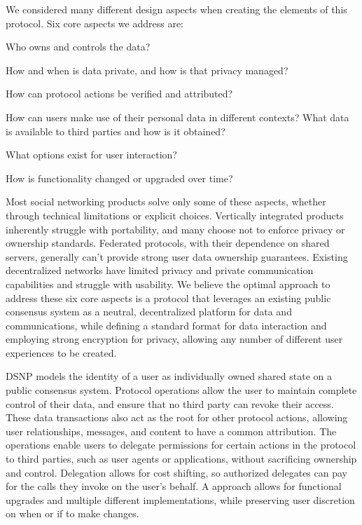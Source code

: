 \documentclass[12pt,letterpaper]{article}
\providecommand{\tightlist}{%
\setlength{\itemsep}{0pt}\setlength{\parskip}{0pt}}
\begin{document}
\begin{samepage}
	We considered many different design aspects when creating the elements of
	this protocol. Six core aspects we address are:

	\begin{description}
		\tightlist
		\item[Ownership:]
		      Who owns and controls the data?
		\item[Privacy:]
		      How and when is data private, and how is that privacy managed?
		\item[Authenticity:]
		      How can protocol actions be verified and attributed?
		\item[Portability:]
		      How can users make use of their personal data in different contexts?
		      What data is available to third parties and how is it obtained?
		\item[Usability:]
		      What options exist for user interaction?
		\item[Extensibility:]
		      How is functionality changed or upgraded over time?
	\end{description}
\end{samepage}

Most social networking products solve only some of these aspects, whether through technical
limitations or explicit choices. Vertically integrated products inherently struggle with
portability, and many choose not to enforce privacy or ownership standards. Federated
protocols, with their dependence on shared servers, generally can't provide strong user data
ownership guarantees. Existing decentralized networks have limited privacy and private
communication capabilities and struggle with usability. We believe the optimal approach to
address these six core aspects is a protocol that leverages an existing public consensus
system as a neutral, decentralized platform for data and communications, while defining a
standard format for data interaction and employing strong encryption for privacy, allowing
any number of different user experiences to be created.

DSNP models the identity of a user as individually owned shared state on a public consensus
system. Protocol operations allow the user to maintain complete control of their data, and
ensure that no third party can revoke their access. These data transactions also act as the
root for other protocol actions, allowing user relationships, messages, and content to have
a common attribution. The operations enable users to delegate permissions for certain
actions in the protocol to third parties, such as user agents or applications, without
sacrificing ownership and control. Delegation allows for cost shifting, so authorized
delegates can pay for the calls they invoke on the user's behalf.  A  approach allows for functional upgrades and multiple different implementations,
while preserving user discretion on when or if to make changes.
\end{document}
